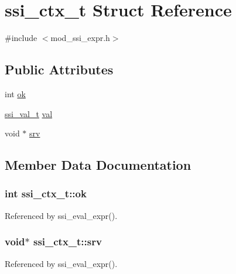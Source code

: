 \hypertarget{structssi__ctx__t}{\section{ssi\-\_\-ctx\-\_\-t Struct Reference}
\label{structssi__ctx__t}
}


{\ttfamily \#include $<$mod\-\_\-ssi\-\_\-expr.\-h$>$}

\subsection*{Public Attributes}
\begin{DoxyCompactItemize}
\item 
int \hyperlink{structssi__ctx__t_a6b8eaad602b5e853709c15fd614891f1}{ok}
\item 
\hyperlink{structssi__val__t}{ssi\-\_\-val\-\_\-t} \hyperlink{structssi__ctx__t_aee4366eefc1c48036a176cf2b5694097}{val}
\item 
void $\ast$ \hyperlink{structssi__ctx__t_afaf9841a100c8cd34ac99bc03c388b57}{srv}
\end{DoxyCompactItemize}


\subsection{Member Data Documentation}
\hypertarget{structssi__ctx__t_a6b8eaad602b5e853709c15fd614891f1}{
\subsubsection[{ok}]{\setlength{\rightskip}{0pt plus 5cm}int ssi\-\_\-ctx\-\_\-t\-::ok}}\label{structssi__ctx__t_a6b8eaad602b5e853709c15fd614891f1}


Referenced by ssi\-\_\-eval\-\_\-expr().

\hypertarget{structssi__ctx__t_afaf9841a100c8cd34ac99bc03c388b57}{
\subsubsection[{srv}]{\setlength{\rightskip}{0pt plus 5cm}void$\ast$ ssi\-\_\-ctx\-\_\-t\-::srv}}\label{structssi__ctx__t_afaf9841a100c8cd34ac99bc03c388b57}


Referenced by ssi\-\_\-eval\-\_\-expr().

